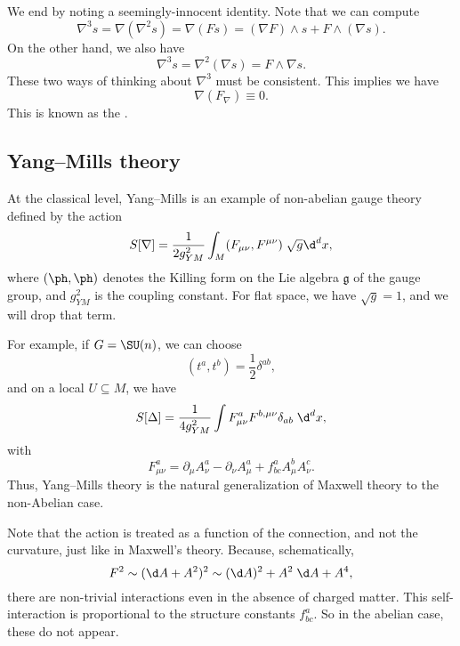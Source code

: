 \documentclass[a4paper]{article}
\begin{document}
We end by noting a seemingly-innocent identity. Note that we can compute
\[
  \nabla^3 s = \nabla(\nabla^2 s) = \nabla(F s) = (\nabla F)\wedge s + F\wedge (\nabla s).
\]
On the other hand, we also have
\[
  \nabla^3 s = \nabla^2 (\nabla s) = F \wedge \nabla s.
\]
These two ways of thinking about $\nabla^3$ must be consistent. This implies we have
\[
  \nabla (F_\nabla) \equiv 0.
\]
This is known as the .

\subsection{Yang--Mills theory}
At the classical level, Yang--Mills is an example of non-abelian gauge theory defined by the action %
\[
  S[\nabla] = \frac{1}{2g^2_{YM}} \int_M (F_{\mu\nu}, F^{\mu\nu}) \;\sqrt{g} \d^d x,
\]
where $(\ph, \ph)$ denotes the Killing form on the Lie algebra $\mathfrak{g}$ of the gauge group, and $g^2_{YM}$ is the coupling constant. For flat space, we have $\sqrt{g} = 1$, and we will drop that term.

For example, if $G = \SU(n)$, we can choose
\[
  (t^a, t^b) = \frac{1}{2} \delta^{ab},
\]
and on a local $U \subseteq M$, we have
\[
  S[\Delta] = \frac{1}{4 g^2_{YM}} \int F_{\mu\nu}^a F^{b, \mu\nu} \delta_{ab} \; \d^d x,
\]
with
\[
  F_{\mu\nu}^a = \partial_\mu A^a_\nu - \partial_\nu A_\mu^a + f^a_{bc} A_\mu^b A_\nu^c.
\]
Thus, Yang--Mills theory is the natural generalization of Maxwell theory to the non-Abelian case.

Note that the action is treated as a function of the connection, and not the curvature, just like in Maxwell's theory. Because, schematically,
\[
  F^2 \sim (\d A + A^2)^2 \sim (\d A)^2 + A^2 \;\d A + A^4,
\]
there are non-trivial interactions even in the absence of charged matter. This self-interaction is proportional to the structure constants $f^a_{bc}$. So in the abelian case, these do not appear.
\end{document}
